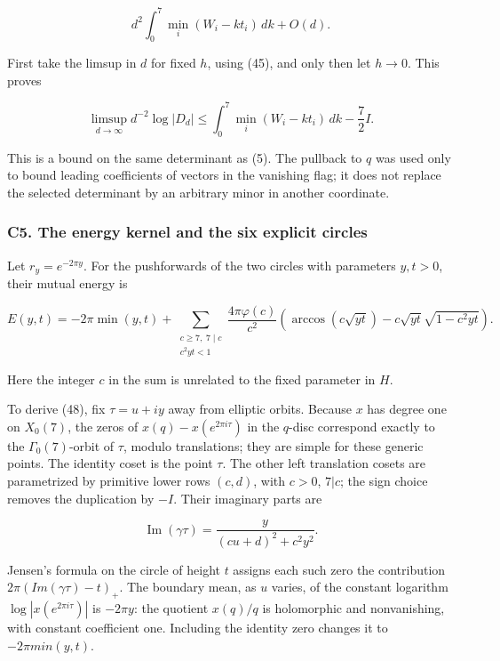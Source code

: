 \documentclass[11pt,a4paper]{article}
\begin{document}
\[
d^2\int_0^7\min_i(W_i-kt_i)\,dk+O(d).
\]

First take the limsup in \(d\) for fixed \(h\), using (45), and only then let \(h→0\). This proves

\[
\limsup_{d\to\infty}d^{-2}\log|D_d|
\le\int_0^7\min_i(W_i-kt_i)\,dk-\frac72I.\tag{47}
\]

This is a bound on the same determinant as (5). The pullback to \(q\) was used only to bound leading coefficients of vectors in the vanishing flag; it does not replace the selected determinant by an arbitrary minor in another coordinate.

\hypertarget{c5.-the-energy-kernel-and-the-six-explicit-circles}{%
\subsubsection{C5. The energy kernel and the six explicit circles}\label{c5.-the-energy-kernel-and-the-six-explicit-circles}}

Let \(r_y=e^{-2πy}\). For the pushforwards of the two circles with parameters \(y,t>0\), their mutual energy is

\[
E(y,t)=-2\pi\min(y,t)+
\sum_{\substack{c\ge7,\;7\mid c\\c^2yt<1}}
\frac{4\pi\varphi(c)}{c^2}
\left(\arccos(c\sqrt{yt})-c\sqrt{yt}\sqrt{1-c^2yt}\right).\tag{48}
\]

Here the integer \(c\) in the sum is unrelated to the fixed parameter in \(H\).

To derive (48), fix \(τ=u+iy\) away from elliptic orbits. Because \(x\) has degree one on \(X_{0}(7)\), the zeros of \(x(q)-x(e^{2πiτ})\) in the \(q\)-disc correspond exactly to the \(Γ_{0}(7)\)-orbit of \(τ\), modulo translations; they are simple for these generic points. The identity coset is the point \(τ\). The other left translation cosets are parametrized by primitive lower rows \((c,d)\), with \(c>0\), \(7|c\); the sign choice removes the duplication by \(-I\). Their imaginary parts are

\[
\operatorname{Im}(\gamma\tau)=\frac{y}{(cu+d)^2+c^2y^2}.
\]

Jensen's formula on the circle of height \(t\) assigns each such zero the contribution \(2π(Im(γτ)-t)_+\). The boundary mean, as \(u\) varies, of the constant logarithm \(\operatorname{log}|x(e^{2πiτ})|\) is \(-2πy\): the quotient \(x(q)/q\) is holomorphic and nonvanishing, with constant coefficient one. Including the identity zero changes it to \(-2πmin(y,t)\).
\end{document}
